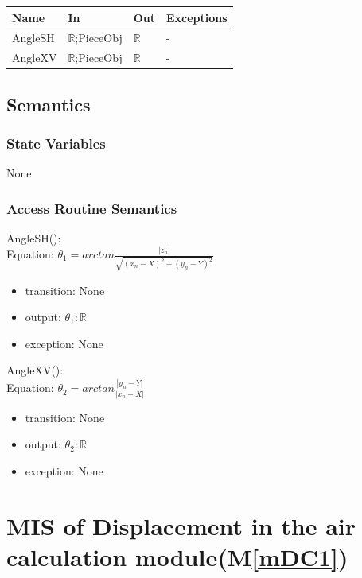 \documentclass[12pt, titlepage]{article}
\newcommand{\mref}[1]{M\ref{#1}}
\begin{document}
\begin{center}
	\begin{tabular}{p{2cm} p{4cm} p{4cm} p{2cm}}
		\hline
		\textbf{Name} & \textbf{In} & \textbf{Out} & \textbf{Exceptions} \\
		\hline
		AngleSH & $\mathbb{R}$;PieceObj & $\mathbb{R}$ & - \\
		AngleXV & $\mathbb{R}$;PieceObj & $\mathbb{R}$ & - \\
		\hline
	\end{tabular}
\end{center}

\subsection{Semantics}

\subsubsection{State Variables}

None

\subsubsection{Access Routine Semantics}

\noindent AngleSH():\\
Equation: $\theta_{1}=arctan \frac{|z_{n}|}{\sqrt{(x_{n}-X)^2+(y_{n}-Y)^2}}$
\begin{itemize}
	\item transition: None   
	\item output: $\theta_{1}: \mathbb{R}$
	\item exception: None
\end{itemize}

\noindent AngleXV():\\
Equation: $\theta_{2}=arctan \frac{|y_{n}-Y|}{|x_{n}-X|}$
\begin{itemize}
	\item transition: None  
	\item output: $\theta_{2}: \mathbb{R}$
	\item exception: None
\end{itemize}

\section{MIS of Displacement in the air calculation module(\mref{mDC1})}
\end{document}
